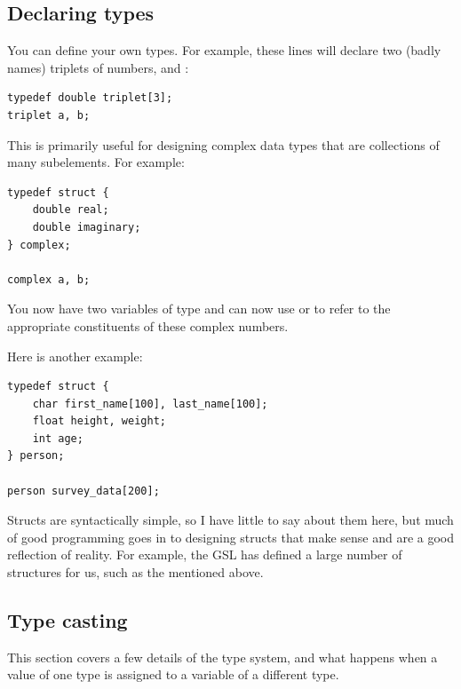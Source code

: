 

\subsection{Declaring types}  
You can define your own
types. For example, these lines will declare two (badly names) triplets
of numbers,  and :

\begin{lstlisting}
typedef double triplet[3];
triplet	a, b;
\end{lstlisting}

This is primarily useful for designing
complex data types that are collections of many subelements. 
For example:

\begin{lstlisting}
typedef struct {
    double real;
    double imaginary;
} complex;

complex a, b;
\end{lstlisting}

You now have two variables of type  and can now use  or  to refer to the appropriate constituents
of these complex numbers. 

Here is another example:
\begin{lstlisting}
typedef struct {
    char first_name[100], last_name[100];
    float height, weight;
    int age;
} person;

person survey_data[200];
\end{lstlisting}

Structs are syntactically simple, so I have little to say about them here,
but much of good programming goes in to designing structs that make sense
and are a good reflection of reality.  For example, the GSL has defined
a large number of structures for us, such as the 
mentioned above.



\subsection{\treesymbol Type casting}\label{casting}   
This section covers a few details of the type system, and what happens
when a value of one type is assigned to a variable of a different type.

